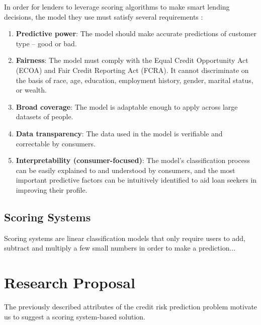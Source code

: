 \documentclass[11pt, margin=1in]{article}
\begin{document}
In order for lenders to leverage scoring algorithms to make smart lending decisions, the model they use must satisfy several requirements \cite{fico-criteria}:
\begin{enumerate}
	\item \textbf{Predictive power}: The model should make accurate predictions of customer type -- good or bad.
	\item \textbf{Fairness}: The model must comply with the Equal Credit Opportunity Act (ECOA) and Fair Credit Reporting Act (FCRA). It cannot discriminate on the basis of race, age, education, employment history, gender, marital status, or wealth.
	\item \textbf{Broad coverage}: The model is adaptable enough to apply across large datasets of people.
	\item \textbf{Data transparency}: The data used in the model is verifiable and correctable by consumers.
	\item \textbf{Interpretability (consumer-focused)}: The model's classification process can be easily explained to and understood by consumers, and the most important predictive factors can be intuitively identified to aid loan seekers in improving their profile.
\end{enumerate}

\subsection{Scoring Systems}
Scoring systems are linear classification models that only require users to add, subtract and multiply a few small numbers in order to make a prediction... \cite{slim, risk-slim}

\section{Research Proposal}
The previously described attributes of the credit risk prediction problem motivate us to suggest a scoring system-based solution.




\end{document}
